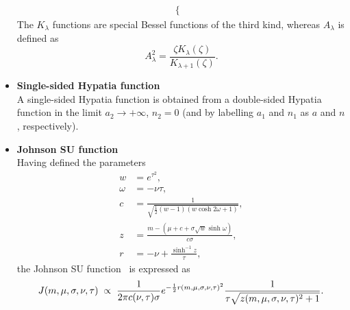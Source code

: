 \begin{itemize}[noitemsep,topsep=0pt]
\begin{multline*}
\begin{cases}
\end{cases}
\end{multline*}
The $K_{\lambda}$ functions are special Bessel functions of the third kind, whereas $A_{\lambda}$ is defined as
\begin{equation*}
A^{2}_{\lambda}=\frac{\zeta K_{\lambda}(\zeta)}{K_{\lambda+1}(\zeta)}.
\end{equation*}
\item{\textbf{Single-sided Hypatia function}} \\
A single-sided Hypatia function is obtained from a double-sided Hypatia function in the limit $a_{2}\to +\infty$, $n_{2}=0$ (and by labelling $a_{1}$ and $n_{1}$ as $a$ and $n$, respectively).
\item{\textbf{Johnson SU function}} \\
Having defined the parameters
\begin{align*}
w &= e^{\tau^{2}}, \\ 
\omega &= -\nu\tau, \\
c &= \frac{1}{\sqrt{\frac{1}{2}(w-1)\left(w\cosh 2\omega+1\right)}}, \\
z &= \frac{m-\left(\mu+c+\sigma\sqrt{w}\sinh{\omega}\right)}{c\sigma}, \\
r &= -\nu + \frac{\sinh^{-1}z}{\tau},
\end{align*}
the Johnson SU function~\cite{JohnsonSU} is expressed as
\begin{equation*}
J(m,\mu,\sigma,\nu,\tau) \hspace{1mm}\propto\hspace{1mm} \frac{1}{2\pi c(\nu,\tau)\sigma}e^{-\frac{1}{2}r(m,\mu,\sigma,\nu,\tau)^{2}}\frac{1}{\tau\sqrt{z(m,\mu,\sigma,\nu,\tau)^{2}+1}}.
\end{equation*}
\end{itemize}

